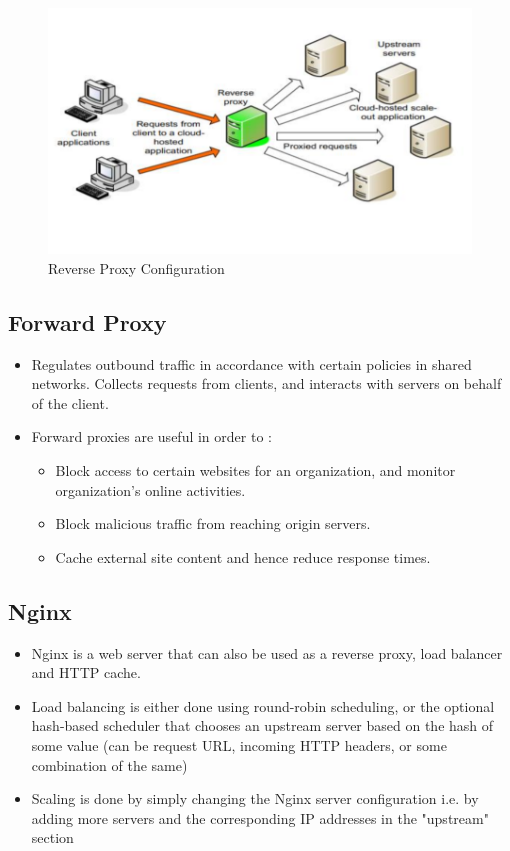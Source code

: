 \documentclass{article}
\begin{document}
\begin{figure}[!h]
    \centering
    \includegraphics[scale=0.65]{p1.png}
    \caption{Reverse Proxy Configuration}
    \label{fig:my_label}
\end{figure}
\subsection{Forward Proxy}
\begin{itemize}
    \item Regulates outbound traffic in accordance with certain policies in shared networks. Collects requests from clients, and interacts with servers on behalf of the client. 
    
    \item Forward proxies are useful in order to :
    \begin{itemize}
        \item Block access to certain websites for an organization, and monitor organization's online activities. 
        
        \item Block malicious traffic from reaching origin servers. 
        
        \item Cache external site content and hence reduce response times. 
    \end{itemize}
\end{itemize}

\subsection{Nginx}
\begin{itemize}
    \item Nginx is a web server that can also be used as a reverse proxy, load balancer and HTTP cache. 
    
    \item Load balancing is either done using round-robin scheduling, or the optional hash-based scheduler that chooses an upstream server based on the hash of some value (can be request URL, incoming HTTP headers, or some combination of the same)
    
    \item Scaling is done by simply changing the Nginx server configuration i.e. by adding more servers and the corresponding IP addresses in the "upstream" section
\end{itemize}
\end{document}
